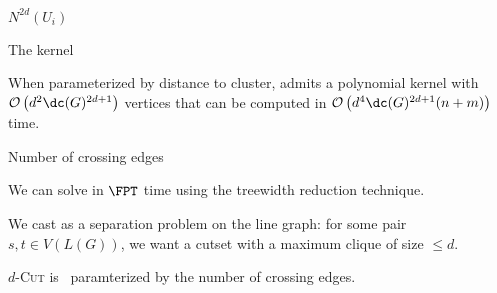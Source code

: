 \begin{frame}{$N^{2d}(U_i)$}
\begin{figure}[!htb]
    \end{figure}
\end{frame}

\begin{frame}{The kernel}
    
    \begin{theorem}
        When parameterized by distance to cluster,  admits a polynomial kernel with $\bigO{d^2\dc(G)^{2d+1}}$ vertices that can be computed in $\bigO{d^4\dc(G)^{2d+1}(n+m)}$ time.
    \end{theorem}

\end{frame}

\begin{frame}{Number of crossing edges}
    \begin{block}{}
        We can solve  in $\FPT$ time using the treewidth reduction technique.
    \end{block}
    \pause
    \begin{block}{}
        We cast  as a separation problem on the line graph: for some pair $s,t \in V(L(G))$, we want a cutset with a maximum clique of size $\leq d$.
    \end{block}
    \pause
    \begin{theorem}{}
      \textsc{$d$-Cut} is \FPT\ paramterized by the number of crossing edges.
    \end{theorem}
\end{frame}

